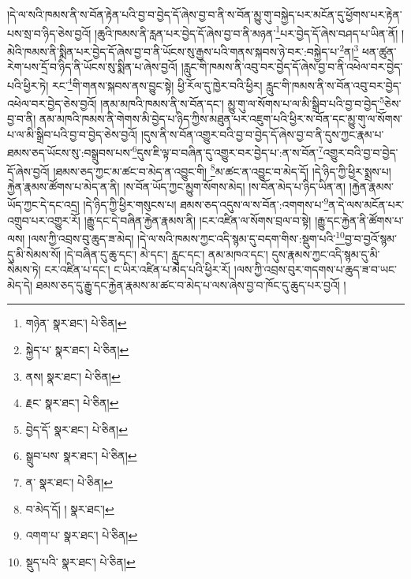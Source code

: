 །དེ་ལ་སའི་ཁམས་ནི་ས་བོན་རྟེན་པའི་བྱ་བ་བྱེད་དོ་ཞེས་བྱ་བ་ནི་ས་བོན་མྱུ་གུ་བསྐྱེད་པར་མངོན་དུ་ཕྱོགས་པར་རྟེན་པས་སྲ་བ་ཉིད་ཅེས་བྱའོ། །ཆུའི་ཁམས་ནི་རླན་པར་བྱེད་དོ་ཞེས་བྱ་བ་ནི་མཉན་\footnote{གཉེན་  སྣར་ཐང་།  པེ་ཅིན། }པར་བྱེད་དོ་ཞེས་བཤད་པ་ཡིན་ནོ། །མེའི་ཁམས་ནི་སྨིན་པར་བྱེད་དོ་ཞེས་བྱ་བ་ནི་ཡོངས་སུ་རྒྱས་པའི་གནས་སྐབས་ཉེ་བར་:བསྐྱེད་པ་\footnote{སྐྱེད་པ་  སྣར་ཐང་།  པེ་ཅིན། }ན།\footnote{ནས།  སྣར་ཐང་།  པེ་ཅིན། } ཕན་ཚུན་རེག་པས་དྲོ་བ་ཉིད་ནི་ཡོངས་སུ་སྨིན་པ་ཞེས་བྱའོ། །རླུང་གི་ཁམས་ནི་འབུ་བར་བྱེད་དོ་ཞེས་བྱ་བ་ནི་འཕེལ་བར་བྱེད་པའི་ཕྱིར་ཏེ། རང་\footnote{རྗང་  སྣར་ཐང་།  པེ་ཅིན། }གི་གནས་སྐབས་ནས་བྱུང་སྟེ། ཕྱི་རོལ་དུ་ཁྱེར་བའི་ཕྱིར། རླུང་གི་ཁམས་ནི་ས་བོན་འབུ་བར་བྱེད་འཕེལ་བར་བྱེད་ཅེས་བྱའོ། །ནམ་མཁའི་ཁམས་ནི་ས་བོན་དང་། མྱུ་གུ་ལ་སོགས་པ་ལ་མི་སྒྲིབ་པའི་བྱ་བ་བྱེད་\footnote{བྱེད་དོ་  སྣར་ཐང་།  པེ་ཅིན། }ཅེས་བྱ་བ་ནི། ནམ་མཁའི་ཁམས་ནི་གེགས་མི་བྱེད་པ་ཉིད་ཀྱིས་མཐུན་པར་འཇུག་པའི་ཕྱིར་ས་བོན་དང་མྱུ་གུ་ལ་སོགས་པ་ལ་མི་སྒྲིབ་པའི་བྱ་བ་བྱེད་ཅེས་བྱའོ། །དུས་ནི་ས་བོན་འགྱུར་བའི་བྱ་བ་བྱེད་དོ་ཞེས་བྱ་བ་ནི་དུས་ཀྱང་རྣམ་པ་ཐམས་ཅད་ཡོངས་སུ་:བསྒྲུབས་པས་\footnote{སྒྲུབ་པས་  སྣར་ཐང་།  པེ་ཅིན། }དུས་ཇི་ལྟ་བ་བཞིན་དུ་འགྱུར་བར་བྱེད་པ་:ན་ས་བོན་\footnote{ན་  སྣར་ཐང་།  པེ་ཅིན། }འགྱུར་བའི་བྱ་བ་བྱེད་དོ་ཞེས་བྱའོ། །ཐམས་ཅད་ཀྱང་མ་ཚང་བ་མེད་ན་འབྱུང་གི། \footnote{བ་མེད་དོ། །   སྣར་ཐང་། }མ་ཚང་ན་འབྱུང་བ་མེད་དོ། །དེ་ཉིད་ཀྱི་ཕྱིར་སྨྲས་པ། རྐྱེན་རྣམས་ཚོགས་པ་མེད་ན་ནི། །ས་བོན་ཡོད་ཀྱང་མྱུག་སོགས་མེད། །ས་བོན་མེད་པ་ཉིད་ཡིན་ན། །རྐྱེན་རྣམས་ཡོད་ཀྱང་དེ་དང་འདྲ། །དེ་ཉིད་ཀྱི་ཕྱིར་གསུངས་པ། ཐམས་ཅད་འདུས་ལ་ས་བོན་:འགགས་པ་\footnote{འགག་པ་  སྣར་ཐང་།  པེ་ཅིན། }ན་དེ་ལས་མངོན་པར་འགྲུབ་པར་འགྱུར་རོ། །རྒྱུ་དང་དེ་བཞིན་རྐྱེན་རྣམས་ནི། །ངར་འཛིན་ལ་སོགས་བྲལ་བ་སྟེ། །རྒྱུ་དང་རྐྱེན་ནི་ཚོགས་པ་ལས། །ལས་ཀྱི་འབྲས་བུ་ཆུད་ཟ་མེད། །དེ་ལ་སའི་ཁམས་ཀྱང་འདི་སྙམ་དུ་བདག་གིས་:སྡུག་པའི་\footnote{སྡུད་པའི་  སྣར་ཐང་།  པེ་ཅིན། }བྱ་བ་བྱའོ་སྙམ་དུ་མི་སེམས་སོ། །དེ་བཞིན་དུ་ཆུ་དང་། མེ་དང་། རླུང་དང་། ནམ་མཁའ་དང་། དུས་རྣམས་ཀྱང་འདི་སྙམ་དུ་མི་སེམས་ཏེ། ངར་འཛིན་པ་དང་། ང་ཡིར་འཛིན་པ་མེད་པའི་ཕྱིར་རོ། །ལས་ཀྱི་འབྲས་བུར་གདགས་པ་ཆུད་ཟ་བ་ཡང་མེད་དེ། ཐམས་ཅད་དུ་རྒྱུ་དང་རྐྱེན་རྣམས་མ་ཚང་བ་མེད་པ་ལས་ཞེས་བྱ་བ་ཁོང་དུ་ཆུད་པར་བྱའོ། །
